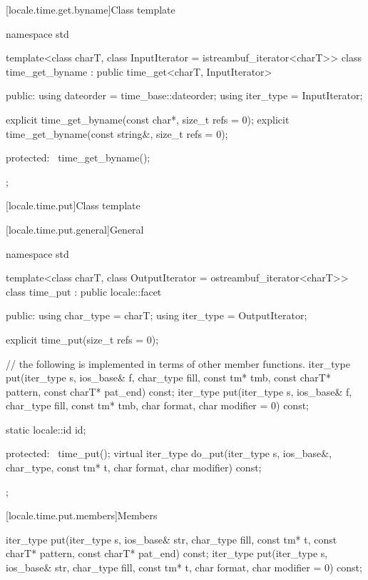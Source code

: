 [locale.time.get.byname]{Class template }

%
\begin{codeblock}
namespace std {
  template<class charT, class InputIterator = istreambuf_iterator<charT>>
    class time_get_byname : public time_get<charT, InputIterator> {
    public:
      using dateorder = time_base::dateorder;
      using iter_type = InputIterator;

      explicit time_get_byname(const char*, size_t refs = 0);
      explicit time_get_byname(const string&, size_t refs = 0);

    protected:
      ~time_get_byname();
    };
}
\end{codeblock}

[locale.time.put]{Class template }

[locale.time.put.general]{General}

%
\begin{codeblock}
namespace std {
  template<class charT, class OutputIterator = ostreambuf_iterator<charT>>
    class time_put : public locale::facet {
    public:
      using char_type = charT;
      using iter_type = OutputIterator;

      explicit time_put(size_t refs = 0);

      // the following is implemented in terms of other member functions.
      iter_type put(iter_type s, ios_base& f, char_type fill, const tm* tmb,
                    const charT* pattern, const charT* pat_end) const;
      iter_type put(iter_type s, ios_base& f, char_type fill,
                    const tm* tmb, char format, char modifier = 0) const;

      static locale::id id;

    protected:
      ~time_put();
      virtual iter_type do_put(iter_type s, ios_base&, char_type, const tm* t,
                               char format, char modifier) const;
    };
}
\end{codeblock}

[locale.time.put.members]{Members}

%
\begin{itemdecl}
iter_type put(iter_type s, ios_base& str, char_type fill, const tm* t,
              const charT* pattern, const charT* pat_end) const;
iter_type put(iter_type s, ios_base& str, char_type fill, const tm* t,
              char format, char modifier = 0) const;
\end{itemdecl}

